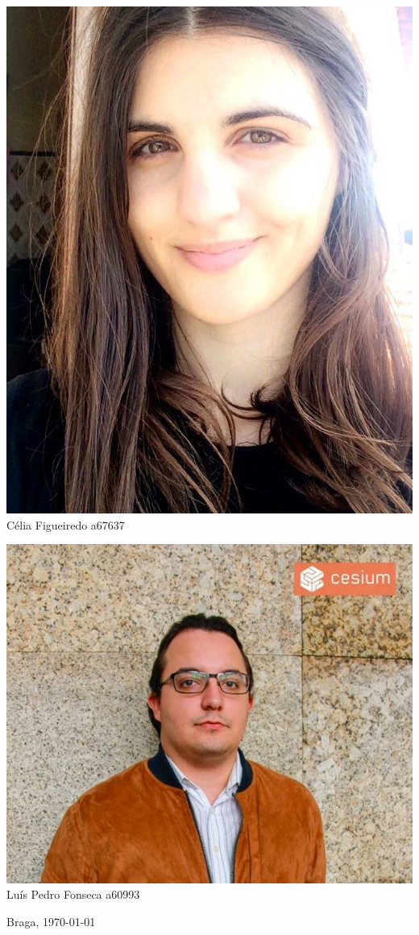 \begin{titlepage}
\begin{center}
\noindent\begin{minipage}[b]{.3\textwidth}
	\includegraphics[scale=0.2]{celia}
	\small{Célia Figueiredo a67637}
\end{minipage} 
\hfill
\begin{minipage}[b]{.3\textwidth}
	\includegraphics[scale=0.3]{luis}
	\small{Luís Pedro Fonseca a60993}
\end{minipage}




\vspace{3ex}


\vfill

\large Braga, {\large \today}

\end{center}
\end{titlepage}
